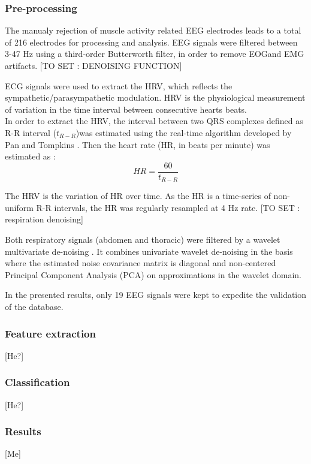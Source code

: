 \subsubsection{Pre-processing}
The manualy rejection of muscle activity related \ac{EEG} electrodes leads to a total of 216 electrodes for processing and analysis. \ac{EEG} signals were filtered between 3-47 Hz using a third-order Butterworth filter, in order to remove \ac{EOG}and \ac{EMG} artifacts.
[TO SET : DENOISING FUNCTION]

\ac{ECG} signals were used to extract the \ac{HRV}, which reflects the sympathetic/parasympathetic modulation. \ac{HRV} is the physiological measurement of variation in the time interval between consecutive hearts beats.\\
In order to extract the \ac{HRV}, the interval between two QRS complexes defined as R-R interval ($t_{R-R}$)was estimated using the real-time algorithm developed by Pan and Tompkins \cite{HR}. Then the heart rate (HR, in beats per minute) was estimated as :
\begin{equation}
	HR = \frac{60}{t_{R-R}}
\end{equation}

The \ac{HRV} is the variation of HR over time. As the HR is a time-series of non-uniform R-R intervals, the HR was regularly resampled at 4 Hz rate.
[TO SET : respiration denoising]

Both respiratory signals (abdomen and thoracic) were filtered by a wavelet multivariate de-noising
\cite{waveletDenoise}.
It combines univariate wavelet de-noising in the basis where the estimated noise covariance matrix is diagonal and non-centered Principal Component Analysis (PCA) on approximations in the wavelet domain.

In the presented results, only 19 \ac{EEG} signals were kept to expedite the validation of the database.


\subsubsection{Feature extraction}
[He?]
\subsubsection{Classification}
[He?]

\subsubsection{Results}
[Me]



